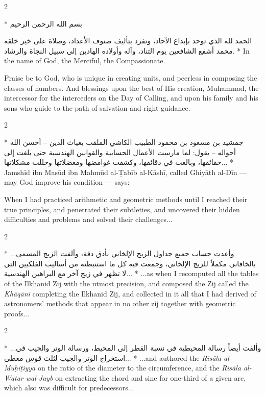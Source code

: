 \documentclass[11pt,a4paper]{article}
\newcommand{\ar}[1]{{\arabicfont\beginR #1\endR}}
\newenvironment{bilingual}{%
  \vspace{0.3em}%
  \begin{paracol}{2}%
}{%
  \end{paracol}%
  \vspace{0.3em}%
}
\begin{document}
\begin{bilingual}
\switchcolumn[0]*
\ar{بسم الله الرحمن الرحيم}

\ar{الحمد لله الذي توحد بإبداع الآحاد، وتفرد بتأليف صنوف الأعداد، وصلاة على خير خلقه محمد أشفع الشافعين يوم التناد، وآله وأولاده الهادين إلى سبيل النجاة والرشاد.}
\switchcolumn[1]*
In the name of God, the Merciful, the Compassionate.

Praise be to God, who is unique in creating units, and peerless in
composing the classes of numbers. And blessings upon the best of His
creation, Muhammad, the intercessor for the interceders on the Day of
Calling, and upon his family and his sons who guide to the path of
salvation and right guidance.
\end{bilingual}

\begin{bilingual}
\switchcolumn[0]*
\ar{جمشيد بن مسعود بن محمود الطبيب الكاشي الملقب بغياث الدين -- أحسن الله أحواله -- يقول: لما مارست الأعمال الحسابية والقوانين الهندسية حتى بلغت إلى حقائقها، وبالغت في دقائقها، وكشفت غوامضها ومعضلاتها وحللت مشكلاتها...}
\switchcolumn[1]*
Jamsh\=id ibn Mas\=ud ibn Mahm\=ud al-\d{T}ab\=ib al-K\=ash\=i, called
Ghiy\=ath al-D\=in --- may God improve his condition --- says:

When I had practiced arithmetic and geometric methods until I reached
their true principles, and penetrated their subtleties, and uncovered
their hidden difficulties and problems and solved their challenges...
\end{bilingual}

\begin{bilingual}
\switchcolumn[0]*
\ar{...وأعدت حساب جميع جداول الزيج الإلخاني بأدق دقة، وألفت الزيج المسمى بالخاقاني مكملاً للزيج الإلخاني، وجمعت فيه كل ما استنبطته من أساليب الفلكيين التي لا تظهر في زيج آخر مع البراهين الهندسية...}
\switchcolumn[1]*
...as when I recomputed all the tables of the Ilkhanid Zij with the utmost precision,
and composed the Zij called the \textit{Kh\=aq\=an\=i} completing the Ilkhanid
Zij, and collected in it all that I had derived of astronomers' methods
that appear in no other zij together with geometric proofs...
\end{bilingual}

\begin{bilingual}
\switchcolumn[0]*
\ar{...وألفت أيضاً رسالة المحيطية في نسبة القطر إلى المحيط، ورسالة الوتر والجيب في استخراج الوتر والجيب لثلث قوس معطى...}
\switchcolumn[1]*
...and authored the \textit{Ris\=ala al-Mu\d{h}i\d{t}iyya} on the ratio of
the diameter to the circumference, and the \textit{Ris\=ala al-Watar
wal-Jayb} on extracting the chord and sine for one-third of a given
arc, which also was difficult for predecessors...
\end{bilingual}
\end{document}
